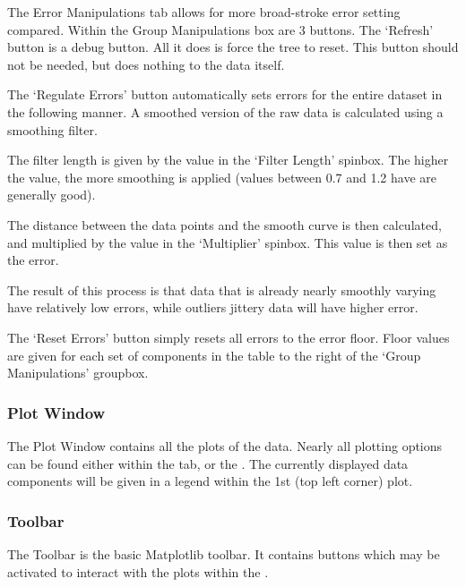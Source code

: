 \documentclass[letterpaper,10pt,english]{sphinxmanual}
\begin{document}
The Error Manipulations tab allows for more broad-stroke error setting compared.
Within the Group Manipulations box are 3 buttons.
The ‘Refresh’ button is a debug button. All it does is force the {\hyperref[\detokenize{content/data_plot/main_window:error-multipliers}]{}} tree to reset. This button should not be needed, but does nothing to the data itself.

The ‘Regulate Errors’ button automatically sets errors for the entire dataset in the following manner.
A smoothed version of the raw data is calculated using a smoothing filter.

The filter length is given by the value in the ‘Filter Length’ spinbox. The higher the value, the more smoothing is applied (values between 0.7 and 1.2 have are generally good).

The distance between the data points and the smooth curve is then calculated, and multiplied by the value in the ‘Multiplier’ spinbox. This value is then set as the error.

The result of this process is that data that is already nearly smoothly varying have relatively low errors, while outliers jittery data will have higher error.

The ‘Reset Errors’ button simply resets all errors to the error floor. Floor values are given for each set of components in the table to the right of the ‘Group Manipulations’ groupbox.


\subsubsection{Plot Window}
\label{\detokenize{content/data_plot/main_window:plot-window}}\label{\detokenize{content/data_plot/main_window:id11}}
\begin{figure}[htbp]
\centering

\noindent{}
\end{figure}

The Plot Window contains all the plots of the data.
Nearly all plotting options can be found either within the {\hyperref[\detokenize{content/data_plot/main_window:plot-options}]{}} tab, or the {\hyperref[\detokenize{content/data_plot/main_window:menu-bar}]{}}.
The currently displayed data components will be given in a legend within the 1st (top left corner) plot.


\subsubsection{Toolbar}
\label{\detokenize{content/data_plot/main_window:toolbar}}
The Toolbar is the basic Matplotlib toolbar. It contains buttons which may be activated to interact with the plots within the {\hyperref[\detokenize{content/data_plot/main_window:plot-window}]{}}.
\end{document}
